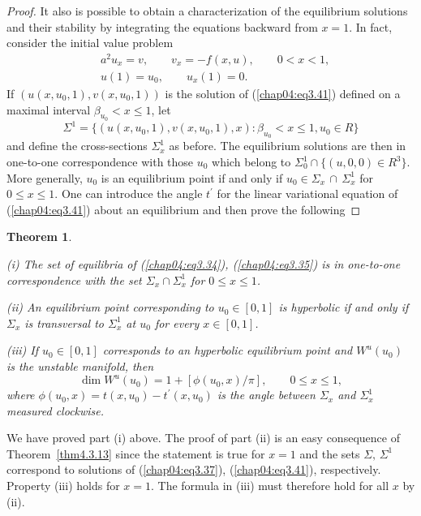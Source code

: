\documentclass{surv-l}
\theoremstyle{plain}
\newtheorem{theorem}{Theorem}[section]
\theoremstyle{definition}
\numberwithin{equation}{section}
\numberwithin{figure}{chapter}
\begin{document}
\begin{proof}
It also is possible to obtain a characterization of the equilibrium solutions and their stability by integrating the equations backward from $x=1$. In fact, consider the initial value problem
\begin{equation}\label{chap04:eq3.41}
\begin{split}
&a^{2}u_{x}=v,\qquad v_{x}=-f(x, u), \qquad 0<x<1,\\
&u(1)=u_{0},\qquad u_{x}(1)=0.
\end{split}
\end{equation}
If $(u(x, u_{0},1), v(x, u_{0},1))$ is the solution of (\ref{chap04:eq3.41}) defined on a maximal interval $\beta_{u_{0}}<x\leq 1$, let
\begin{equation*}\Sigma^{1}=\{(u(x, u_{0},1), v(x, u_{0},1), x):\beta_{u_{0}}<x\leq 1, u_{0}\in R\}
\end{equation*}
and define the cross-sections $\Sigma_{x}^{1}$ as before. The equilibrium solutions are then in one-to-one correspondence with those $u_{0}$ which belong to $\Sigma_{0}^{1}\cap\{(u, 0,0)\in R^{3}\}$. More generally, $u_{0}$ is an equilibrium point if and only if $u_{0}\in\Sigma_{x}\,\cap\,\Sigma_{x}^{1}$ for $0\leq x\leq 1$. One can introduce the angle $t^{\prime}$ for the linear variational equation of (\ref{chap04:eq3.41}) about an equilibrium and then prove the following
\end{proof}
\begin{theorem}\label{thm4.3.14}\

\emph{(i)} The set of equilibria of \emph{(\ref{chap04:eq3.34}), (\ref{chap04:eq3.35})} is in one-to-one correspondence with the set $\Sigma_{x}\cap\Sigma_{x}^{1}$ for $0\leq x\leq 1$.

\emph{(ii)} An equilibrium point corresponding to $u_{0}\in[0,1]$ is hyperbolic if and only if $\Sigma_{x}$ is transversal to $\Sigma_{x}^{1}$ at $u_{0}$ for every $x\in[0,1]$.

\emph{(iii)} If $u_{0}\in[0,1]$ corresponds to an hyperbolic equilibrium point and $W^{u}(u_{0})$ is the unstable manifold, then
\begin{equation*}
\dim W^{u}(u_{0})=1+[\phi(u_{0}, x)/\pi],\qquad 0\leq x\leq 1,
\end{equation*}
where $\phi(u_{0}, x)=t(x, u_{0})-t^{\prime}(x, u_{0})$ is the angle between $\Sigma_{x}$ and $\Sigma_{x}^{1}$ measured clockwise.
\end{theorem}
We have proved part (i) above. The proof of part (ii) is an easy consequence of Theorem~\ref{thm4.3.13} since the statement is true for $x=1$ and the sets $\Sigma,\, \Sigma^{1}$ correspond to solutions of (\ref{chap04:eq3.37}), (\ref{chap04:eq3.41}), respectively. Property (iii) holds for $x=1$. The formula in (iii) must therefore hold for all $x$ by (ii).
\end{document}

